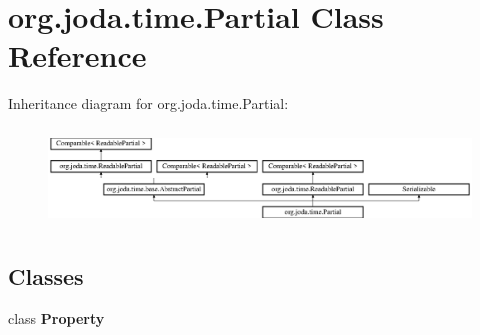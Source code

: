 \hypertarget{classorg_1_1joda_1_1time_1_1_partial}{\section{org.\-joda.\-time.\-Partial Class Reference}
\label{classorg_1_1joda_1_1time_1_1_partial}
}
Inheritance diagram for org.\-joda.\-time.\-Partial\-:\begin{figure}[H]
\begin{center}
\leavevmode
\includegraphics[height=2.654028cm]{classorg_1_1joda_1_1time_1_1_partial}
\end{center}
\end{figure}
\subsection*{Classes}
\begin{DoxyCompactItemize}
\item 
class {\bfseries Property}
\end{DoxyCompactItemize}
